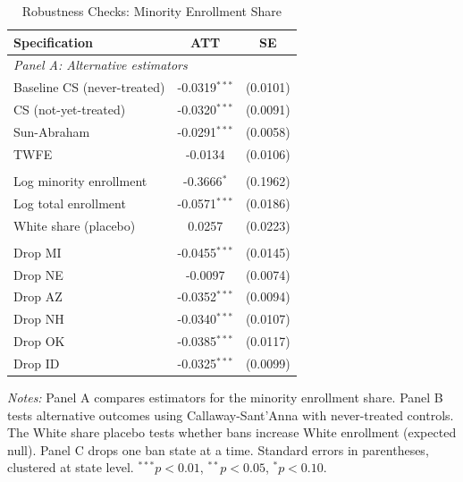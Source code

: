 \begin{table}[htbp]
\centering
\caption{Robustness Checks: Minority Enrollment Share}
\label{tab:robustness}
\begin{tabular}{lcc}
\hline\hline
Specification & ATT & SE \\
\hline
\multicolumn{3}{l}{\textit{Panel A: Alternative estimators}} \\
\addlinespace
Baseline CS (never-treated) & -0.0319$^{***}$ & (0.0101) \\
CS (not-yet-treated) & -0.0320$^{***}$ & (0.0091) \\
Sun-Abraham & -0.0291$^{***}$ & (0.0058) \\
TWFE & -0.0134 & (0.0106) \\
\addlinespace
\multicolumn{3}{l}{\textit{Panel B: Alternative outcomes}} \\
\addlinespace
Log minority enrollment & -0.3666$^{*}$ & (0.1962) \\
Log total enrollment & -0.0571$^{***}$ & (0.0186) \\
White share (placebo) & 0.0257 & (0.0223) \\
\addlinespace
\multicolumn{3}{l}{\textit{Panel C: Leave-one-out}} \\
\addlinespace
Drop MI & -0.0455$^{***}$ & (0.0145) \\
Drop NE & -0.0097 & (0.0074) \\
Drop AZ & -0.0352$^{***}$ & (0.0094) \\
Drop NH & -0.0340$^{***}$ & (0.0107) \\
Drop OK & -0.0385$^{***}$ & (0.0117) \\
Drop ID & -0.0325$^{***}$ & (0.0099) \\
\hline\hline
\end{tabular}
\begin{tablenotes}
\item \textit{Notes:} Panel A compares estimators for the minority enrollment share. Panel B tests alternative outcomes using Callaway-Sant'Anna with never-treated controls. The White share placebo tests whether bans increase White enrollment (expected null). Panel C drops one ban state at a time. Standard errors in parentheses, clustered at state level. $^{***}p<0.01$, $^{**}p<0.05$, $^{*}p<0.10$.
\end{tablenotes}
\end{table}
